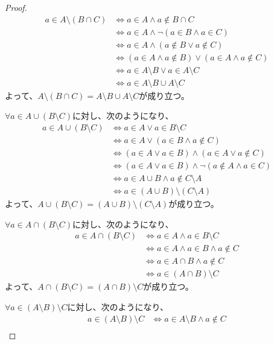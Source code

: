 \documentclass[a4paper]{jsarticle}
\begin{document}
\begin{proof}
\begin{align*}
a \in A \setminus (B \cap C) &\Leftrightarrow a \in A \land a \notin B \cap C\\
&\Leftrightarrow a \in A \land \neg(a \in B \land a \in C)\\
&\Leftrightarrow a \in A \land (a \notin B \vee a \notin C)\\
&\Leftrightarrow (a \in A \land a \notin B) \vee (a \in A \land a \notin C)\\
&\Leftrightarrow a \in A \setminus B \vee a \in A \setminus C\\
&\Leftrightarrow a \in A \setminus B \cup A \setminus C
\end{align*}
よって、$A \setminus (B \cap C) = A \setminus B \cup A \setminus C$が成り立つ。\par
$\forall a \in A \cup (B \setminus C)$に対し、次のようになり、
\begin{align*}
a \in A \cup (B \setminus C) &\Leftrightarrow a \in A \vee a \in B \setminus C\\
&\Leftrightarrow a \in A \vee (a \in B \land a \notin C)\\
&\Leftrightarrow (a \in A \vee a \in B) \land (a \in A \vee a \notin C)\\
&\Leftrightarrow (a \in A \vee a \in B) \land \neg(a \notin A \land a \in C)\\
&\Leftrightarrow a \in A \cup B \land a \notin C \setminus A\\
&\Leftrightarrow a \in (A \cup B) \setminus (C \setminus A)
\end{align*}
よって、$A \cup (B \setminus C) = (A \cup B) \setminus (C \setminus A)$が成り立つ。\par
$\forall a \in A \cap (B \setminus C)$に対し、次のようになり、
\begin{align*}
a \in A \cap (B \setminus C) &\Leftrightarrow a \in A \land a \in B \setminus C\\
&\Leftrightarrow a \in A \land a \in B \land a \notin C\\
&\Leftrightarrow a \in A \cap B \land a \notin C\\
&\Leftrightarrow a \in (A \cap B) \setminus C
\end{align*}
よって、$A \cap (B \setminus C) = (A \cap B) \setminus C$が成り立つ。\par
$\forall a \in (A \setminus B) \setminus C$に対し、次のようになり、
\begin{align*}
a \in (A \setminus B) \setminus C &\Leftrightarrow a \in A \setminus B \land a \notin C\\

\end{align*}
\end{proof}
\end{document}
